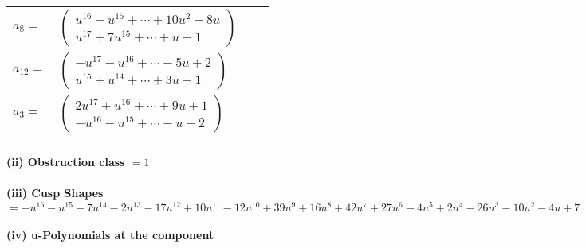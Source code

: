 \documentclass[1p]{elsarticle_modified}
\theoremstyle{definition}
\begin{document}
\begin{tabular}{m{7pt} m{180pt} m{7pt} m{180pt} }
\flushright $a_{8}=$&$\begin{pmatrix}u^{16}- u^{15}+\cdots+10 u^2-8 u\\u^{17}+7 u^{15}+\cdots+u+1\end{pmatrix}$ \\
\flushright $a_{12}=$&$\begin{pmatrix}- u^{17}- u^{16}+\cdots-5 u+2\\u^{15}+u^{14}+\cdots+3 u+1\end{pmatrix}$ \\
\flushright $a_{3}=$&$\begin{pmatrix}2 u^{17}+u^{16}+\cdots+9 u+1\\- u^{16}- u^{15}+\cdots- u-2\end{pmatrix}$\\&\end{tabular}
\flushleft \textbf{(ii) Obstruction class $= 1$}\\~\\
\flushleft \textbf{(iii) Cusp Shapes $= - u^{16}- u^{15}-7 u^{14}-2 u^{13}-17 u^{12}+10 u^{11}-12 u^{10}+39 u^9+16 u^8+42 u^7+27 u^6-4 u^5+2 u^4-26 u^3-10 u^2-4 u+7$}\\~\\
\newpage\renewcommand{\arraystretch}{1}
\flushleft \textbf{(iv) u-Polynomials at the component}\newline \\
\end{document}

